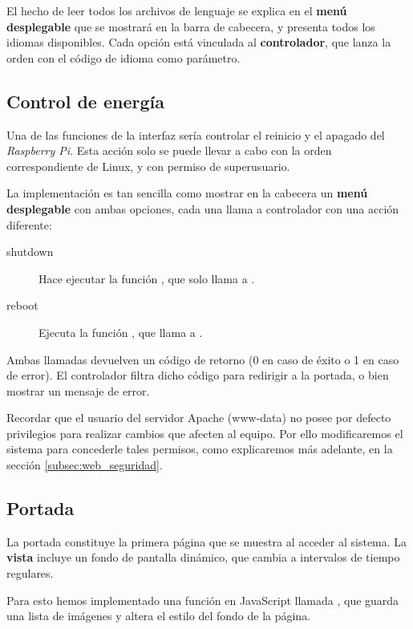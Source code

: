 El hecho de leer todos los archivos de lenguaje se explica en el \textbf{menú desplegable} que se mostrará en la barra de cabecera, y presenta todos los idiomas disponibles. Cada opción está vinculada al \textbf{controlador}, que lanza la orden  con el código de idioma como parámetro.

\subsection{Control de energía}

Una de las funciones de la interfaz sería controlar el reinicio y el apagado del \textit{Raspberry Pi}. Esta acción solo se puede llevar a cabo con la orden correspondiente de Linux, y con permiso de superusuario.

La implementación es tan sencilla como mostrar en la cabecera un \textbf{menú desplegable} con ambas opciones, cada una llama a controlador con una acción diferente:

\begin{description}
	\item[shutdown] Hace ejecutar la función , que solo llama a .

	\item[reboot] Ejecuta la función , que llama a .
\end{description}

Ambas llamadas devuelven un código de retorno (0 en caso de éxito o 1 en caso de error). El controlador filtra dicho código para redirigir a la portada, o bien mostrar un mensaje de error.

Recordar que el usuario del servidor Apache (www-data) no posee por defecto privilegios para realizar cambios que afecten al equipo. Por ello modificaremos el sistema para concederle tales permisos, como explicaremos más adelante, en la sección \ref{subsec:web_seguridad}.

\subsection{Portada}

La portada constituye la primera página que se muestra al acceder al sistema. La \textbf{vista} incluye un fondo de pantalla dinámico, que cambia a intervalos de tiempo regulares.

Para esto hemos implementado una función en JavaScript llamada , que guarda una lista de imágenes y altera el estilo del fondo de la página.

